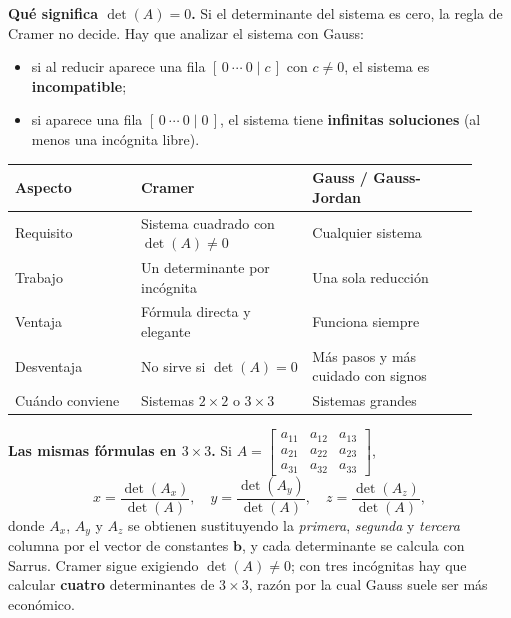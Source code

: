 \documentclass[12pt, letterpaper]{article}
\newcommand{\mwmat}[1]{\ensuremath{\begin{bmatrix}#1\end{bmatrix}}}
\begin{document}
\begin{cuadroteoria}
  \small
  \textbf{Qué significa $\det(A)=0$.} Si el determinante del sistema es
  cero, la regla de Cramer no decide. Hay que analizar el sistema con Gauss:
  \begin{itemize}[leftmargin=1.2em, nosep]
    \item si al reducir aparece una fila $[\,0\ \cdots\ 0\mid c\,]$ con
          $c\neq0$, el sistema es \textbf{incompatible};
    \item si aparece una fila $[\,0\ \cdots\ 0\mid 0\,]$, el sistema tiene
          \textbf{infinitas soluciones} (al menos una incógnita libre).
  \end{itemize}
\end{cuadroteoria}

\begin{center}
\small
\begin{tabular}{@{}p{0.25\linewidth} p{0.34\linewidth} p{0.33\linewidth}@{}}
  \toprule
  \textbf{Aspecto} & \textbf{Cramer} & \textbf{Gauss / Gauss-Jordan} \\
  \midrule
  Requisito & Sistema cuadrado con $\det(A)\neq0$ & Cualquier sistema \\
  Trabajo & Un determinante por incógnita & Una sola reducción \\
  Ventaja & Fórmula directa y elegante & Funciona siempre \\
  Desventaja & No sirve si $\det(A)=0$ & Más pasos y más cuidado con signos \\
  Cuándo conviene & Sistemas $2\times2$ o $3\times3$ & Sistemas grandes \\
  \bottomrule
\end{tabular}
\end{center}

\begin{cuadroextra}
  \small
  \textbf{Las mismas fórmulas en $3\times3$.} Si
  $A=\mwmat{a_{11}&a_{12}&a_{13}\\a_{21}&a_{22}&a_{23}\\a_{31}&a_{32}&a_{33}}$,
  \[
    x=\frac{\det(A_x)}{\det(A)},\quad
    y=\frac{\det(A_y)}{\det(A)},\quad
    z=\frac{\det(A_z)}{\det(A)},
  \]
  donde $A_x$, $A_y$ y $A_z$ se obtienen sustituyendo la \emph{primera},
  \emph{segunda} y \emph{tercera} columna por el vector de constantes
  $\mathbf{b}$, y cada determinante se calcula con Sarrus. Cramer sigue
  exigiendo $\det(A)\neq0$; con tres incógnitas hay que calcular
  \textbf{cuatro} determinantes de $3\times3$, razón por la cual Gauss suele
  ser más económico.
\end{cuadroextra}
\end{document}

